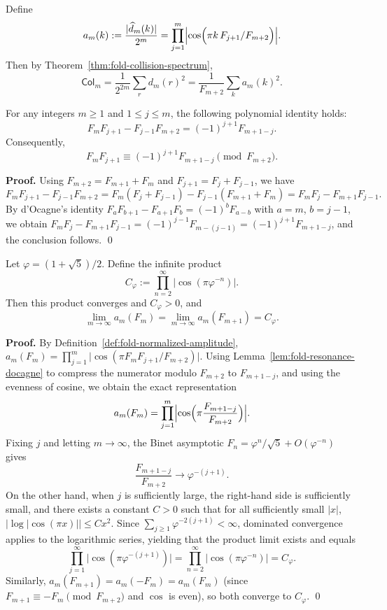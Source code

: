 \begin{definition}\label{def:fold-normalized-amplitude}
Define
\[
a_m(k):=\frac{|\widehat d_m(k)|}{2^m}
=\prod_{j=1}^m\Bigl|\cos\Bigl(\pi k\,F_{j+1}/F_{m+2}\Bigr)\Bigr|.
\]
Then by Theorem~\ref{thm:fold-collision-spectrum},
\[
\mathsf{Col}_m
=\frac{1}{2^{2m}}\sum_r d_m(r)^2
=\frac{1}{F_{m+2}}\sum_{k} a_m(k)^2.
\]
\end{definition}

\begin{lemma}\label{lem:fold-resonance-docagne}
For any integers \(m\ge 1\) and \(1\le j\le m\), the following polynomial identity holds:
\[
F_mF_{j+1}-F_{j-1}F_{m+2}=(-1)^{j+1}F_{m+1-j}.
\]
Consequently,
\[
F_mF_{j+1}\equiv (-1)^{j+1}F_{m+1-j}\pmod{F_{m+2}}.
\]
\end{lemma}

\textbf{Proof.}
Using \(F_{m+2}=F_{m+1}+F_m\) and \(F_{j+1}=F_j+F_{j-1}\), we have
\[
F_mF_{j+1}-F_{j-1}F_{m+2}
=F_m(F_j+F_{j-1})-F_{j-1}(F_{m+1}+F_m)
=F_mF_j-F_{m+1}F_{j-1}.
\]
By d'Ocagne's identity
\(
F_aF_{b+1}-F_{a+1}F_b=(-1)^bF_{a-b}
\)
with \(a=m\), \(b=j-1\), we obtain
\(
F_mF_j-F_{m+1}F_{j-1}=(-1)^{j-1}F_{m-(j-1)}=(-1)^{j+1}F_{m+1-j}
\), and the conclusion follows. \qed

\begin{theorem}\label{thm:fold-critical-resonance-constant}
Let \(\varphi=(1+\sqrt5)/2\). Define the infinite product
\[
C_\varphi:=\prod_{n=2}^{\infty}\bigl|\cos(\pi \varphi^{-n})\bigr|.
\]
Then this product converges and \(C_\varphi>0\), and
\[
\lim_{m\to\infty}a_m(F_m)=\lim_{m\to\infty}a_m(F_{m+1})=C_\varphi.
\]
\end{theorem}

\textbf{Proof.}
By Definition~\ref{def:fold-normalized-amplitude},
\(
a_m(F_m)=\prod_{j=1}^m\bigl|\cos(\pi F_mF_{j+1}/F_{m+2})\bigr|
\).
Using Lemma~\ref{lem:fold-resonance-docagne} to compress the numerator modulo \(F_{m+2}\) to \(F_{m+1-j}\), and using the evenness of cosine, we obtain the exact representation
\[
a_m(F_m)=\prod_{j=1}^m\Bigl|\cos\Bigl(\pi \frac{F_{m+1-j}}{F_{m+2}}\Bigr)\Bigr|.
\]
Fixing \(j\) and letting \(m\to\infty\), the Binet asymptotic \(F_n=\varphi^n/\sqrt5+O(\varphi^{-n})\) gives
\[
\frac{F_{m+1-j}}{F_{m+2}}\to \varphi^{-(j+1)}.
\]
On the other hand, when \(j\) is sufficiently large, the right-hand side is sufficiently small, and there exists a constant \(C>0\) such that for all sufficiently small \(|x|\),
\(
|\log|\cos(\pi x)||\le Cx^2
\).
Since \(\sum_{j\ge 1}\varphi^{-2(j+1)}<\infty\), dominated convergence applies to the logarithmic series, yielding that the product limit exists and equals
\[
\prod_{j=1}^{\infty}\bigl|\cos(\pi \varphi^{-(j+1)})\bigr|
=\prod_{n=2}^{\infty}\bigl|\cos(\pi \varphi^{-n})\bigr|
=C_\varphi.
\]
Similarly, \(a_m(F_{m+1})=a_m(-F_m)=a_m(F_m)\) (since \(F_{m+1}\equiv -F_m\pmod{F_{m+2}}\) and \(\cos\) is even), so both converge to \(C_\varphi\). \qed

